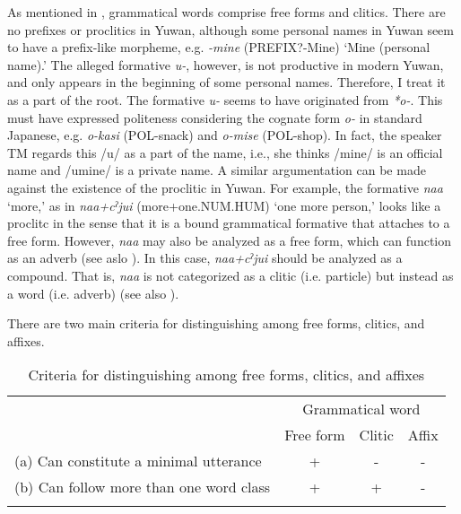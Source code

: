 As mentioned in , grammatical words comprise free forms and clitics. There are no prefixes or proclitics in Yuwan, although some personal names in Yuwan seem to have a prefix-like morpheme, e.g. \textit{-mine} (PREFIX?-Mine) ‘Mine (personal name).’ The alleged formative \textit{u-}, however, is not productive in modern Yuwan, and only appears in the beginning of some personal names. Therefore, I treat it as a part of the root. The formative \textit{u-} seems to have originated from \textit{*o-}. This must have expressed politeness considering the cognate form \textit{o-} in standard Japanese, e.g. \textit{o-kasi} (POL-snack) and \textit{o-mise} (POL-shop). In fact, the speaker TM regards this /u/ as a part of the name, i.e., she thinks /mine/ is an official name and /umine/ is a private name. A similar argumentation can be made against the existence of the proclitic in Yuwan. For example, the formative \textit{naa} ‘more,’ as in \textit{naa+cˀjui} (more+one.NUM.HUM) ‘one more person,’ looks like a proclitc in the sense that it is a bound grammatical formative that attaches to a free form. However, \textit{naa} may also be analyzed as a free form, which can function as an adverb (see aslo ). In this case, \textit{naa+cˀjui} should be analyzed as a compound. That is, \textit{naa} is not categorized as a clitic (i.e. particle) but instead as a word (i.e. adverb) (see also ).

There are two main criteria for distinguishing among free forms, clitics, and affixes.

\begin{table}
\caption{\label{tab:24}Criteria for distinguishing among free forms, clitics, and affixes}
\begin{tabular}{lccc}
\lsptoprule
& \multicolumn{3}{c}{Grammatical word}\\
& Free form  & Clitic &  Affix\\\midrule
(a) Can constitute a minimal utterance  & +  & {}- &  {}-\\
(b) Can follow more than one word class & +  & +   & {}- \\
\lspbottomrule
\end{tabular}
\end{table}


